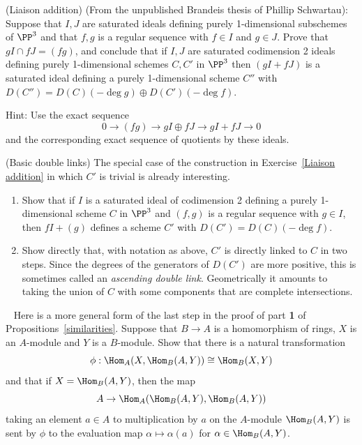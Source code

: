 \begin{exercise} (Liaison addition)\label{Liaison addition}
(From the unpublished Brandeis thesis of Phillip Schwartau):
Suppose that $I, J$ are saturated ideals defining purely 1-dimensional subschemes of $\PP^3$
and that $f,g$ is a regular sequence with $f\in I$ and $g\in J$.
Prove that $g I \cap fJ = (fg)$, and conclude that if $I,J$ are saturated codimension 2 ideals
 defining purely 1-dimensional schemes $C,C'$ in $\PP^3$
 then  $(gI+fJ)$ is a saturated ideal defining a purely 1-dimensional
scheme $C''$ with $D(C'') = D(C)(-\deg g) \oplus D(C')(-\deg f)$.

Hint: Use the exact sequence 
$$
0\to (fg) \to gI \oplus fJ \to gI+fJ \to 0
$$
and the corresponding exact sequence of quotients by these ideals.
\end{exercise}


\begin{exercise}(Basic double links)\label{Basic double links}
The special case of the construction in Exercise~\ref{Liaison addition} in which $C'$ is trivial is already interesting. 

\begin{enumerate}
 \item Show that if $I$ is a saturated ideal of codimension 2
 defining a purely 1-dimensional scheme $C$ in $\PP^3$
 and $(f, g)$ is a regular sequence with $g\in I$, 
 then  $fI+(g)$ defines a scheme $C'$ with $D(C') = D(C)(-\deg f)$.

 \item Show directly that, with notation as above, $C'$ is directly linked to $C$
 in two steps. Since the degrees of the generators of $D(C')$ are more positive, this
 is sometimes called an \emph{ascending double link}. Geometrically it amounts to taking the
union of $C$ with some  components that are complete intersections.
 \end{enumerate}

\end{exercise}

\begin{exercise}~\label{adjointness}
Here is a more general form of the last step in the proof of part {\bf 1} of
Propositions~\ref{similarities}. Suppose that $B\to A$ is a homomorphism of rings, $X$ is an $A$-module and $Y$ is a 
$B$-module. Show that there is a natural transformation
$$
\phi: \Hom_A(X, \Hom_B(A, Y)) \cong \Hom_B(X,Y)
$$
and that if $X = \Hom_B(A,Y)$, then the map
$$
A\to \Hom_A(\Hom_B(A,Y), \Hom_B(A, Y)) 
$$
taking an element  $a\in A$ to multiplication by $a$ on the $A$-module  $\Hom_B(A, Y)$
is sent by $\phi$ to the evaluation map $\alpha \mapsto \alpha(a)$ for
$\alpha \in \Hom_B(A,Y)$.

 
\end{exercise}

